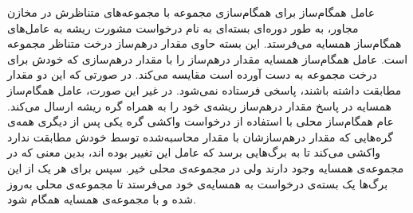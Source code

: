 عامل همگام‌ساز برای همگام‌سازی مجموعه با مجموعه‌های متناظرش در مخازن مجاور، به طور دوره‌ای بسته‌ای به نام درخواست مشورت ریشه به عامل‌های همگام‌ساز همسایه می‌فرستد. این بسته حاوی مقدار درهم‌ساز درخت متناظر مجموعه است. عامل همگام‌ساز همسایه مقدار در‌هم‌ساز را با مقدار در‌هم‌سازی که خودش برای درخت مجموعه به دست آورده است مقایسه می‌کند. در صورتی که این دو مقدار مطابقت داشته باشند، پاسخی فرستاده نمی‌شود. در غیر این صورت، عامل همگام‌ساز همسایه در پاسخ مقدار در‌هم‌ساز ریشه‌ی خود را به همراه گره ریشه ارسال می‌کند. عام همگام‌ساز محلی با استفاده از درخواست واکشی گره یکی پس از دیگری همه‌ی گره‌هایی که مقدار در‌هم‌سازشان با مقدار محاسبه‌شده توسط خودش مطابقت ندارد واکشی می‌کند تا به برگ‌هایی برسد که عامل این تغییر بوده اند، بدین معنی که در مجموعه‌ی همسایه وجود دارند ولی در مجموعه‌ی محلی خیر. سپس برای هر یک از این برگ‌ها یک بسته‌ی درخواست به همسایه‌ی خود می‌فرستد تا مجموعه‌ی محلی به‌روز شده و با مجموعه‌ی همسایه همگام شود.
 	

